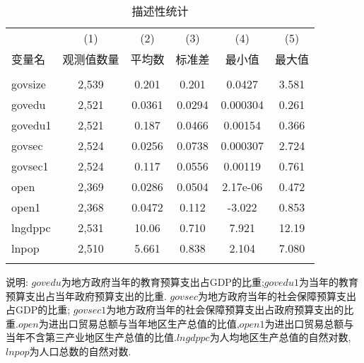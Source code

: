 \documentclass[10pt]{article}
\begin{document}
    \begin{table}[ht]
        \begin{center}
            \caption{描述性统计}
            \label{tb:des}
            \begin{threeparttable}
            \begin{tabular}{lccccc} \hline \hline
                 & (1) & (2) & (3) & (4) & (5) \\
                变量名 & 观测值数量 & 平均数 & 标准差 & 最小值 & 最大值 \\ \hline
                 &  &  &  &  &  \\
                govsize & 2,539 & 0.201 & 0.201 & 0.0427 & 3.581 \\
                govedu & 2,521 & 0.0361 & 0.0294 & 0.000304 & 0.261 \\
                govedu1 & 2,521 & 0.187 & 0.0466 & 0.00154 & 0.366 \\
                govsec & 2,524 & 0.0256 & 0.0738 & 0.000307 & 2.724 \\
                govsec1 & 2,524 & 0.117 & 0.0556 & 0.00119 & 0.761 \\
                open & 2,369 & 0.0286 & 0.0504 & 2.17e-06 & 0.472 \\
                open1 & 2,368 & 0.0472 & 0.112 & -3.022 & 0.853 \\
                lngdppc & 2,531 & 10.06 & 0.710 & 7.921 & 12.19 \\
                lnpop & 2,510 & 5.661 & 0.838 & 2.104 & 7.080 \\
                 &  &  &  &  &  \\ \hline \hline
            \end{tabular}

            \begin{tablenotes}
                \item 说明:
                $govedu$为地方政府当年的教育预算支出占GDP的比重;$govedu1$为当年的教育预算支出占当年政府预算支出的比重.
                 $govsec$为地方政府当年的社会保障预算支出占GDP的比重; $govsec1$为地方政府当年的社会保障预算支出占政府预算支出的比重.$open$为进出口贸易总额与当年地区生产总值的比值,$open1$为进出口贸易总额与当年不含第三产业地区生产总值的比值.$lngdppc$为人均地区生产总值的自然对数,$lnpop$为人口总数的自然对数.
            \end{tablenotes}
            \end{threeparttable}
        \end{center}
    \end{table}
\end{document}
